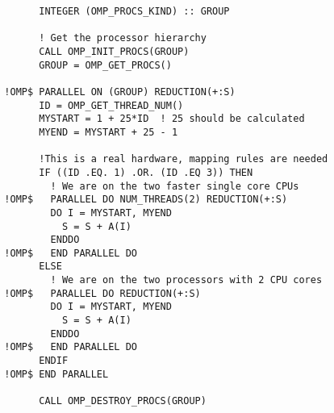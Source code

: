 {\footnotesize
\begin{verbatim}
        INTEGER (OMP_PROCS_KIND) :: GROUP

        ! Get the processor hierarchy
        CALL OMP_INIT_PROCS(GROUP)
        GROUP = OMP_GET_PROCS()

  !OMP$ PARALLEL ON (GROUP) REDUCTION(+:S)
        ID = OMP_GET_THREAD_NUM()
        MYSTART = 1 + 25*ID  ! 25 should be calculated
        MYEND = MYSTART + 25 - 1

        !This is a real hardware, mapping rules are needed
        IF ((ID .EQ. 1) .OR. (ID .EQ 3)) THEN
          ! We are on the two faster single core CPUs
  !OMP$   PARALLEL DO NUM_THREADS(2) REDUCTION(+:S)
          DO I = MYSTART, MYEND
            S = S + A(I)
          ENDDO
  !OMP$   END PARALLEL DO
        ELSE
          ! We are on the two processors with 2 CPU cores
  !OMP$   PARALLEL DO REDUCTION(+:S)
          DO I = MYSTART, MYEND
            S = S + A(I)
          ENDDO
  !OMP$   END PARALLEL DO
        ENDIF
  !OMP$ END PARALLEL

        CALL OMP_DESTROY_PROCS(GROUP)
\end{verbatim}
}

%
%


